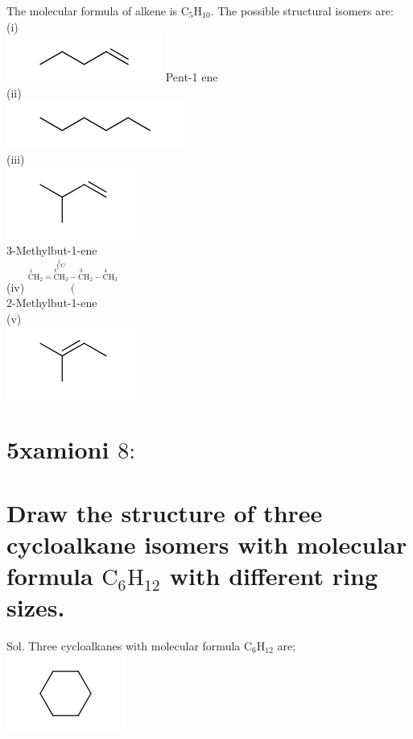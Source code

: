 \documentclass[10pt]{article}
\begin{document}
The molecular formula of alkene is $\mathrm{C}_{5} \mathrm{H}_{10}$. The possible structural isomers are:\\
(i)\\
\includegraphics{smile-56a284f39c057a1e40be9844c8b9eac1822ff8a1} Pent-1 ene\\
(ii)\\
\includegraphics{smile-62344a8e05704723b7f54b6a9db68c5b64ea658d}\\
(iii)\\
\includegraphics{smile-d4100974d8fe254a9a26d1f7791e4740efa66aef}\\
3-Methylbut-1-ene\\
(iv) $\stackrel{\stackrel{1}{\mathrm{C}} \mathrm{H}_{2}=\stackrel{\stackrel{2}{\mathrm{C}} \mathrm{C}}{\stackrel{\mathrm{C}}{\mathrm{C}} \mathrm{H}_{3}}-\stackrel{3}{\mathrm{C}} \mathrm{H}_{2}-\stackrel{4}{\mathrm{C}} \mathrm{H}_{3}}{( }$\\
2-Methylbut-1-ene\\
(v)\\
\includegraphics{smile-384de3c825ff44748f4435e3583ecb7ce837479d}

\section*{5xamioni $8:$}
\section*{Draw the structure of three cycloalkane isomers with molecular formula $\mathrm{C}_{6} \mathrm{H}_{12}$ with different ring sizes.}
Sol. Three cycloalkanes with molecular formula $\mathrm{C}_{6} \mathrm{H}_{12}$ are;\\
\includegraphics{smile-acf671de66923b5f810d07504c85a1f3830ce913}
\end{document}
